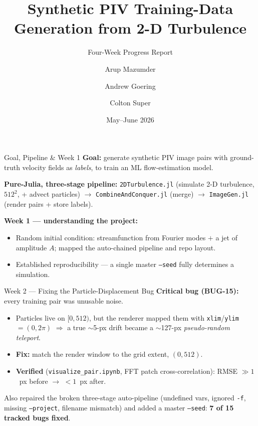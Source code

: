 \documentclass[aspectratio=169]{beamer}
\title[PIV Data Generation]{Synthetic PIV Training-Data Generation from 2-D Turbulence}
\subtitle{Four-Week Progress Report}
\author[Mazumder, Goering, Super]{Arup Mazumder \and Andrew Goering \and Colton Super}
\institute[URI]{Surf Lab, Graduate School of Oceanography, University of Rhode Island\\ \footnotesize Advisor: Prof.\ Nicholas Pizzo}
\date{May--June 2026}
\newcommand{\code}[1]{\texttt{\small #1}}
\begin{document}
\begin{frame}
  \titlepage
\end{frame}

\begin{frame}{Goal, Pipeline \& Week 1}
  \textbf{Goal:} generate synthetic PIV image pairs with ground-truth velocity
  fields as \emph{labels}, to train an ML flow-estimation model.

  \medskip
  \textbf{Pure-Julia, three-stage pipeline:}
  \code{2DTurbulence.jl} (simulate 2-D turbulence, $512^2$, + advect particles)
  $\rightarrow$ \code{CombineAndConquer.jl} (merge) $\rightarrow$
  \code{ImageGen.jl} (render pairs + store labels).

  \medskip
  \textbf{Week 1 --- understanding the project:}
  \begin{itemize}
    \item Random initial condition: streamfunction from Fourier modes $+$ a jet of
          amplitude $A$; mapped the auto-chained pipeline and repo layout.
    \item Established reproducibility --- a single master \code{--seed} fully
          determines a simulation.
  \end{itemize}
\end{frame}

\begin{frame}{Week 2 --- Fixing the Particle-Displacement Bug}
  \textbf{Critical bug (BUG-15):} every training pair was unusable noise.
  \begin{itemize}
    \item Particles live on $[0,512)$, but the renderer mapped them with
          \code{xlim}/\code{ylim}$=(0,2\pi)$ $\Rightarrow$ a true $\sim$5-px drift
          became a $\sim$127-px \emph{pseudo-random teleport}.
    \item \textbf{Fix:} match the render window to the grid extent, $(0,512)$.
    \item \textbf{Verified} (\code{visualize\_pair.ipynb}, FFT patch
          cross-correlation): RMSE $\gg 1$~px before $\rightarrow$ $<1$~px after.
  \end{itemize}
  \footnotesize Also repaired the broken three-stage auto-pipeline (undefined vars,
  ignored \code{-f}, missing \code{--project}, filename mismatch) and added a master
  \code{--seed}: \textbf{7 of 15 tracked bugs fixed}.
\end{frame}
\end{document}
